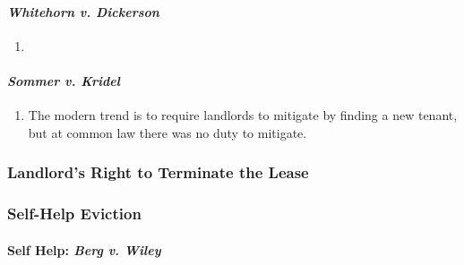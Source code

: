\paragraph{\emph{Whitehorn v. Dickerson}} %

\begin{enumerate}
    \item 
\end{enumerate}

\paragraph{\emph{Sommer v. Kridel}} %

\begin{enumerate}
    \item The modern trend is to require landlords to mitigate by finding a 
    new tenant, but at common law there was no duty to mitigate.
\end{enumerate}

\subsubsection{Landlord's Right to Terminate the Lease} %

\subsubsection{Self-Help Eviction} %

\paragraph{Self Help: \emph{Berg v. Wiley}}

